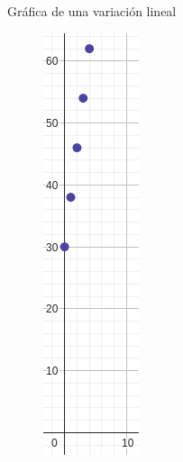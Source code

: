 \begin{infocard}{Gráfica de una variación lineal}
\begin{minipage}[t]{0.2\textwidth}
\begin{figure}[H]
            \includegraphics[width=0.5\linewidth]{../images/20230320232504}
            \caption{}%
            \label{fig:20230320232504}
        \end{figure}
    \end{minipage}

\end{infocard}



